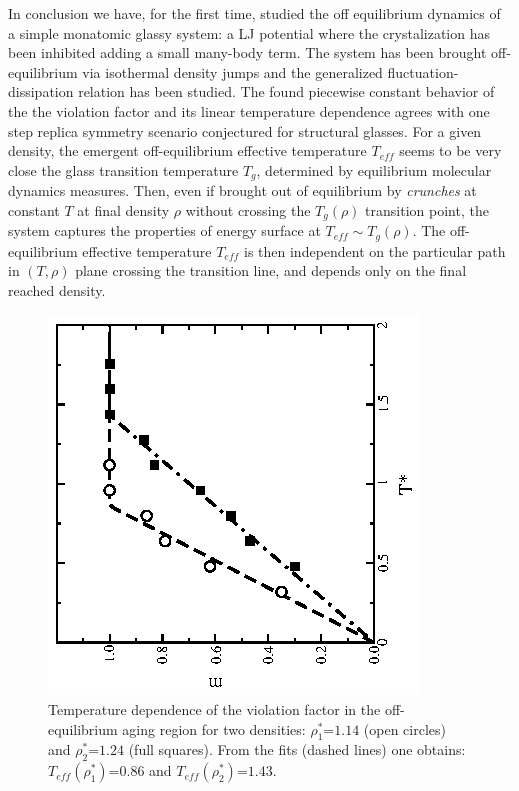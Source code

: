 In conclusion we have, for the first time, studied the off equilibrium dynamics
of a simple monatomic glassy system: a LJ potential where the crystalization
has been inhibited adding a small many-body term. The system has been brought
off-equilibrium via isothermal density jumps and the generalized
fluctuation-dissipation relation has been studied.
The found piecewise constant behavior of the the violation factor and its
linear temperature dependence agrees with one step replica symmetry scenario
conjectured for structural glasses.
For a given density, the emergent off-equilibrium effective temperature
$T_{\!e\!f\!\!f}$ seems to be very close the glass transition temperature $T_g$,
determined by equilibrium molecular dynamics measures.
Then, even if brought out of equilibrium by {\it crunches} at constant $T$
at final density $\rho$ without crossing the $T_g(\rho)$ transition point,
the system captures the properties of energy surface at $T_{\!e\!f\!\!f} \sim T_g (\rho)$.
The off-equilibrium effective temperature $T_{\!e\!f\!\!f}$ is then independent
on the particular path in $(T,\rho)$ plane crossing the transition line, and
depends only on the final reached density.
\begin{figure}[t]
\centering
\vspace{-.8cm}
\includegraphics[width=.35\textwidth,angle=-90]{mt.ps}
\caption{
Temperature dependence of the violation factor in the off-equilibrium
aging region for two densities: $\rho^*_1$=$1.14$ (open circles) and
$\rho^*_2$=$1.24$ (full squares).
From the fits (dashed lines) one obtains:
$T_{\!e\!f\!\!f} (\rho^*_1)$=$0.86 $ and $T_{\!e\!f\!\!f} (\rho^*_2)$=$1.43$.
}

\label{fig_4}
\end{figure}


